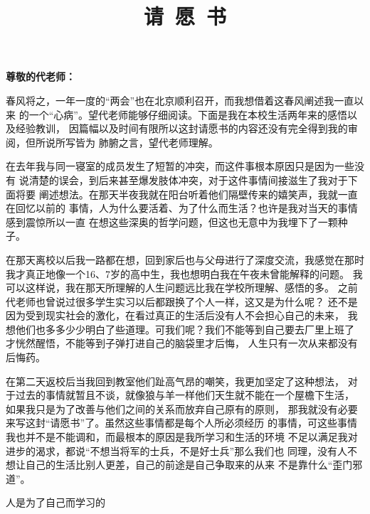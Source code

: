\documentclass[a4paper]{article}
\title{\zihao{-0} \textbf{请~愿~书}}
\author{} \date{}
\begin{document}
\maketitle

\begin{flushleft}
	\textbf{尊敬的代老师：}
\end{flushleft}

春风将之，一年一度的“两会”也在北京顺利召开，而我想借着这春风阐述我一直以来
的一个“心病”。望代老师能够仔细阅读。下面是我在本校生活两年来的感悟以及经验教训，
因篇幅以及时间有限所以这封请愿书的内容还没有完全得到我的审阅，但所说所写皆为
肺腑之言，望代老师理解。

在去年我与同一寝室的成员发生了短暂的冲突，而这件事根本原因只是因为一些没有
说清楚的误会，到后来甚至爆发肢体冲突，对于这件事情间接滋生了我对于下面将要
阐述想法。在那天半夜我就在阳台听着他们隔壁传来的嬉笑声，我就一直在回忆以前的
事情，人为什么要活着、为了什么而生活？也许是我对当天的事情感到震惊所以一直
在想这些深奥的哲学问题，但这也无意中为我埋下了一颗种子。

在那天离校以后我一路都在想，回到家后也与父母进行了深度交流，我感觉在那时
我才真正地像一个16、7岁的高中生，我也想明白我在午夜未曾能解释的问题。
我可以这样说，我在那天所理解的人生问题远比我在学校所理解、感悟的多。
之前代老师也曾说过很多学生实习以后都跟换了个人一样，这又是为什么呢？
还不是因为受到现实社会的激化，在看过真正的生活后没有人不会担心自己的未来，
我想他们也多多少少明白了些道理。可我们呢？我们不能等到自己要去厂里上班了
才恍然醒悟，不能等到子弹打进自己的脑袋里才后悔，
人生只有一次从来都没有后悔药。

在第二天返校后当我回到教室他们趾高气昂的嘲笑，我更加坚定了这种想法，
对于过去的事情就暂且不谈，就像狼与羊一样他们天生就不能在一个屋檐下生活，
如果我只是为了改善与他们之间的关系而放弃自己原有的原则，
那我就没有必要来写这封“请愿书”了。虽然这些事情都是每个人所必须经历
的事情，可这些事情我也并不是不能调和，而最根本的原因是我所学习和生活的环境
不足以满足我对进步的渴求，都说“不想当将军的士兵，不是好士兵”那么我们也
同理，没有人不想让自己的生活比别人更差，自己的前途是自己争取来的从来
不是靠什么“歪门邪道”。

人是为了自己而学习的
\end{document}
